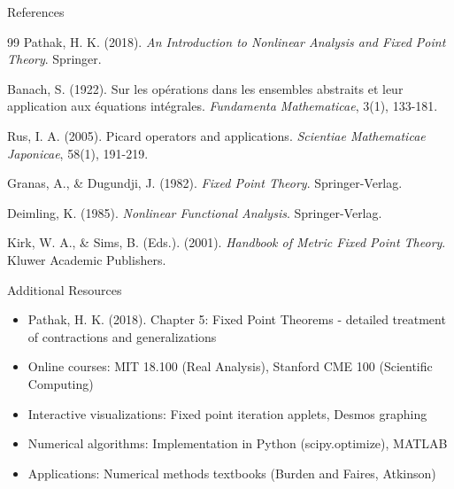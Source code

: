 \documentclass[aspectratio=169,10pt]{beamer}
\begin{document}
\begin{frame}[allowframebreaks]{References}
    \begin{thebibliography}{99}
         Pathak, H. K. (2018). \textit{An Introduction to Nonlinear Analysis and Fixed Point Theory}. Springer.

         Banach, S. (1922). Sur les opérations dans les ensembles abstraits et leur application aux équations intégrales. \textit{Fundamenta Mathematicae}, 3(1), 133-181.

         Rus, I. A. (2005). Picard operators and applications. \textit{Scientiae Mathematicae Japonicae}, 58(1), 191-219.

         Granas, A., \& Dugundji, J. (1982). \textit{Fixed Point Theory}. Springer-Verlag.

         Deimling, K. (1985). \textit{Nonlinear Functional Analysis}. Springer-Verlag.

         Kirk, W. A., \& Sims, B. (Eds.). (2001). \textit{Handbook of Metric Fixed Point Theory}. Kluwer Academic Publishers.
    \end{thebibliography}
\end{frame}

\begin{frame}{Additional Resources}
    \begin{itemize}
        \item Pathak, H. K. (2018). Chapter 5: Fixed Point Theorems - detailed treatment of contractions and generalizations

        \item Online courses: MIT 18.100 (Real Analysis), Stanford CME 100 (Scientific Computing)

        \item Interactive visualizations: Fixed point iteration applets, Desmos graphing

        \item Numerical algorithms: Implementation in Python (scipy.optimize), MATLAB

        \item Applications: Numerical methods textbooks (Burden and Faires, Atkinson)
    \end{itemize}
\end{frame}
\end{document}

